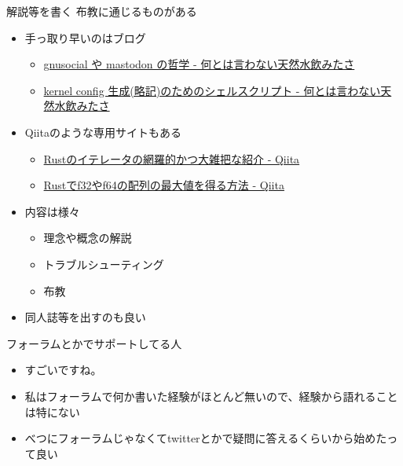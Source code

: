 \documentclass[
        unicode%
    ]{beamer}
\begin{document}
\begin{frame}{解説等を書く}
    布教に通じるものがある

    \begin{itemize}
        \pause
        \item 手っ取り早いのはブログ
            \begin{itemize}
                \item \href{https://blog.cardina1.red/2017/04/13/federated-social-web/}{gnusocial や mastodon の哲学 - 何とは言わない天然水飲みたさ}
                \item \href{https://blog.cardina1.red/2016/12/06/kernel-config-shellscript/}{kernel config 生成(略記)のためのシェルスクリプト - 何とは言わない天然水飲みたさ}
            \end{itemize}
        \pause
        \item Qiitaのような専用サイトもある
            \begin{itemize}
                \item \href{http://qiita.com/lo48576/items/34887794c146042aebf1}{Rustのイテレータの網羅的かつ大雑把な紹介 - Qiita}
                \item \href{http://qiita.com/lo48576/items/343ca40a03c3b86b67cb}{Rustでf32やf64の配列の最大値を得る方法 - Qiita}
            \end{itemize}
        \pause
        \item 内容は様々
            \begin{itemize}
                \item 理念や概念の解説
                \item トラブルシューティング
                \item 布教
            \end{itemize}
        \pause
        \item 同人誌等を出すのも良い
    \end{itemize}
\end{frame}

\begin{frame}{フォーラムとかでサポートしてる人}
    \begin{itemize}
        \item すごいですね。
        \pause
        \item 私はフォーラムで何か書いた経験がほとんど無いので、経験から語れることは特にない
        \item べつにフォーラムじゃなくてtwitterとかで疑問に答えるくらいから始めたって良い
    \end{itemize}
\end{frame}
\end{document}
